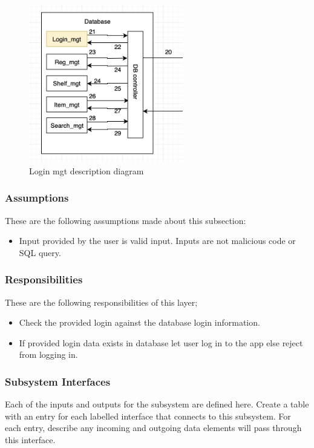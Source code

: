 \begin{figure}[h!]
	\centering
 	\includegraphics[width=0.60\textwidth]{images/loginmgt}
 \caption{Login mgt description diagram}
\end{figure}

\subsubsection{Assumptions}
These are the following assumptions made about this subsection:
\begin{itemize}
    \item Input provided by the user is valid input. Inputs are not malicious code or SQL query.
\end{itemize}

\subsubsection{Responsibilities}
These are the following responsibilities of this layer;
\begin{itemize}
    \item Check the provided login against the database login information.
    \item If provided login data exists in database let user log in to the app else reject from logging in.
\end{itemize}

\subsubsection{Subsystem Interfaces}
Each of the inputs and outputs for the subsystem are defined here. Create a table with an entry for each labelled interface that connects to this subsystem. For each entry, describe any incoming and outgoing data elements will pass through this interface.

